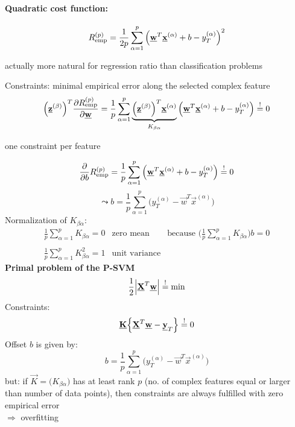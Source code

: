 \paragraph{Quadratic cost function:}
\begin{equation}
	R_{\operatorname{emp}}^{(p)} = \frac{1}{2p} \sum\limits_{\alpha = 1}^p \Big( 
		\underline{\mathbf{w}}^T \underline{\mathbf{x}}^{(\alpha)} + b - y_T^{(\alpha)}
		\Big)^2
\end{equation}
\begin{itemize}
	\itR actually more natural for regression ratio than classification 
		problems
\end{itemize}
Constraints: minimal empirical error along the selected complex feature
\begin{equation} 
	\Big( \underline{\mathbf{z}}^{(\beta)} \Big)^T \frac{\partial R_{\operatorname{emp}}^{(p)} }{
		\partial \underline{\mathbf{w}}} = \frac{1}{p}
		\sum\limits_{\alpha = 1}^p 
		\underbrace{ \Big( \underline{\mathbf{z}}^{(\beta)} \Big)^T 
			\underline{\mathbf{x}}^{(\alpha)} }_{K_{\beta \alpha}}
		\Big( \underline{\mathbf{w}}^T \underline{\mathbf{x}}^{(\alpha)} + b - y_T^{(\alpha)}
		\Big) \stackrel{\mathrm{!}}{=} 0
\end{equation}
\begin{itemize}
	\itR one constraint per feature
\end{itemize}
\begin{equation}
	\frac{\partial}{\partial b} R_{\operatorname{emp}}^{(p)} 
	= \frac{1}{p} \sum\limits_{\alpha = 1}^p \Big( \underline{\mathbf{w}}^T
		\underline{\mathbf{x}}^{(\alpha)} + b - y_T^{(\alpha)}
		\Big) \stackrel{\mathrm{!}}{=} 0
\end{equation}
\begin{equation}
	\leadsto b = \frac{1}{p} \sum\limits_{\alpha = 1}^p 
		\Big( y_T^{(\alpha)} - \vec{w}^T \vec{x}^{(\alpha)} \Big)
\end{equation}
Normalization of $K_{\beta \alpha}$:
\begin{equation} 
	\begin{array}{lll}
		\frac{1}{p} \sum\limits_{\alpha = 1}^p K_{\beta \alpha} = 0
		& \text{zero mean} 
		& \text{because } \bigg( \frac{1}{p} \sum\limits_{\alpha = 1}^p
			K_{\beta \alpha} \bigg) b = 0 \\\\
		\frac{1}{p} \sum\limits_{\alpha = 1}^p K_{\beta \alpha}^2 = 1
		& \text{unit variance}
	\end{array}
\end{equation}
{\bf Primal problem of the P-SVM}
\begin{equation} 
	\frac{1}{2} \Big| \underline{\mathbf{X}}^T \underline{\mathbf{w}} \Big| \stackrel{\mathrm{!}}{=} \min
\end{equation}
Constraints: 
\begin{equation}
 	\underline{\mathbf{K}} \Big\{ \underline{\mathbf{X}}^T \underline{\mathbf{w}} - \underline{\mathbf{y}}_T \Big\} \stackrel{\mathrm{!}}{=} 0
\end{equation}
Offset $b$ is given by:
\begin{equation}
	b = \frac{1}{p} \sum\limits_{\alpha = 1}^p \Big( y_T^{(\alpha)} 
		- \vec{w}^T \vec{x}^{(\alpha)} \Big)
\end{equation}
but: if $\vec{K} = \big( K_{\beta \alpha} \big)$ has at least rank $p$ (no. of complex features equal or larger than number of data points), then constraints are always fulfilled with zero empirical error \\
\indent $\Rightarrow$ overfitting

